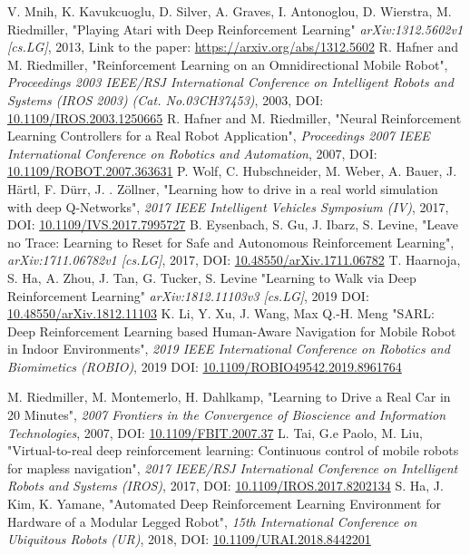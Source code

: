 \documentclass[12pt]{report}
\begin{document}
\begin{thebibliography}{99}
V. Mnih, K. Kavukcuoglu, D. Silver, A. Graves, I. Antonoglou, D. Wierstra, M. Riedmiller,
"Playing Atari with Deep Reinforcement Learning"
\textit{arXiv:1312.5602v1 [cs.LG]}, 2013,
Link to the paper: \href{https://arxiv.org/abs/1312.5602}{https://arxiv.org/abs/1312.5602}
R. Hafner and M. Riedmiller,
"Reinforcement Learning on an Omnidirectional Mobile Robot",
\textit{Proceedings 2003 IEEE/RSJ International Conference on Intelligent Robots and Systems (IROS 2003) (Cat. No.03CH37453)}, 2003,
DOI: \href{https://doi.org/10.1109/IROS.2003.1250665}{10.1109/IROS.2003.1250665}
R. Hafner and M. Riedmiller,
"Neural Reinforcement Learning Controllers for a Real Robot Application",
\textit{Proceedings 2007 IEEE International Conference on Robotics and Automation}, 2007,
DOI: \href{https://doi.org/10.1109/ROBOT.2007.363631}{10.1109/ROBOT.2007.363631}
P. Wolf, C. Hubschneider, M. Weber, A. Bauer, J. Härtl, F. Dürr, J. . Zöllner,
"Learning how to drive in a real world simulation with deep Q-Networks",
\textit{2017 IEEE Intelligent Vehicles Symposium (IV)}, 2017, 
DOI: \href{https://doi.org/10.1109/IVS.2017.7995727}{10.1109/IVS.2017.7995727}
B. Eysenbach, S. Gu, J. Ibarz, S. Levine,
"Leave no Trace: Learning to Reset for Safe and Autonomous Reinforcement Learning",
\textit{arXiv:1711.06782v1 [cs.LG]}, 2017,
DOI: \href{https://doi.org/10.48550/arXiv.1711.06782}{10.48550/arXiv.1711.06782}
T. Haarnoja, S. Ha, A. Zhou, J. Tan, G. Tucker, S. Levine
"Learning to Walk via Deep Reinforcement Learning"
\textit{arXiv:1812.11103v3 [cs.LG]}, 2019
DOI: \href{https://doi.org/10.48550/arXiv.1812.11103}{10.48550/arXiv.1812.11103}
K. Li, Y. Xu, J. Wang, Max Q.-H. Meng
"SARL: Deep Reinforcement Learning based Human-Aware Navigation for Mobile Robot in Indoor Environments",
\textit{2019 IEEE International Conference on Robotics and Biomimetics (ROBIO)}, 2019
DOI: \href{https://doi.org/10.1109/ROBIO49542.2019.8961764}{10.1109/ROBIO49542.2019.8961764}

M. Riedmiller, M. Montemerlo, H. Dahlkamp,
"Learning to Drive a Real Car in 20 Minutes",
\textit{2007 Frontiers in the Convergence of Bioscience and Information Technologies}, 2007,
DOI: \href{https://doi.org/10.1109/FBIT.2007.37}{10.1109/FBIT.2007.37}
L. Tai, G.e Paolo, M. Liu,
"Virtual-to-real deep reinforcement learning: Continuous control of mobile robots for mapless navigation",
\textit{2017 IEEE/RSJ International Conference on Intelligent Robots and Systems (IROS)}, 2017,
DOI: \href{https://doi.org/10.1109/IROS.2017.8202134}{10.1109/IROS.2017.8202134}
S. Ha, J. Kim, K. Yamane,
"Automated Deep Reinforcement Learning Environment for Hardware of a Modular Legged Robot",
\textit{15th International Conference on Ubiquitous Robots (UR)}, 2018,
DOI: \href{https://doi.org/10.1109/URAI.2018.8442201}{10.1109/URAI.2018.8442201}


\end{thebibliography}
\end{document}
